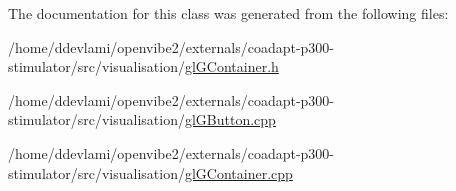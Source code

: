 The documentation for this class was generated from the following files:\begin{DoxyCompactItemize}
\item 
/home/ddevlami/openvibe2/externals/coadapt-\/p300-\/stimulator/src/visualisation/\hyperlink{glGContainer_8h}{glGContainer.h}\item 
/home/ddevlami/openvibe2/externals/coadapt-\/p300-\/stimulator/src/visualisation/\hyperlink{glGButton_8cpp}{glGButton.cpp}\item 
/home/ddevlami/openvibe2/externals/coadapt-\/p300-\/stimulator/src/visualisation/\hyperlink{glGContainer_8cpp}{glGContainer.cpp}\end{DoxyCompactItemize}
